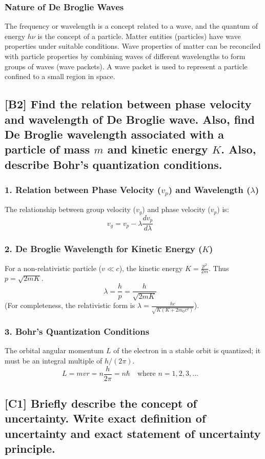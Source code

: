 \documentclass[12pt]{article}
\begin{document}
\subsubsection*{Nature of De Broglie Waves}
The frequency or wavelength is a concept related to a wave, and the quantum of energy $h\nu$ is the concept of a particle. Matter entities (particles) have wave properties under suitable conditions. Wave properties of matter can be reconciled with particle properties by combining waves of different wavelengths to form groups of waves (wave packets). A wave packet is used to represent a particle confined to a small region in space.

\subsection{[B2] Find the relation between phase velocity and wavelength of De Broglie wave. Also, find De Broglie wavelength associated with a particle of mass $m$ and kinetic energy $K$. Also, describe Bohr’s quantization conditions.}

\subsubsection*{1. Relation between Phase Velocity ($v_p$) and Wavelength ($\lambda$)}
The relationship between group velocity ($v_g$) and phase velocity ($v_p$) is:
$$
v_g = v_p - \lambda \frac{dv_p}{d\lambda} \quad \text{}
$$

\subsubsection*{2. De Broglie Wavelength for Kinetic Energy ($K$)}
For a non-relativistic particle ($v \ll c$), the kinetic energy $K = \frac{p^2}{2m}$. Thus $p = \sqrt{2mK}$.
$$
\lambda = \frac{h}{p} = \frac{h}{\sqrt{2mK}} \quad \text{}
$$
(For completeness, the relativistic form is $\lambda = \frac{hc}{\sqrt{K(K+2m_0c^2)}}$).

\subsubsection*{3. Bohr’s Quantization Conditions}
The orbital angular momentum $L$ of the electron in a stable orbit is quantized; it must be an integral multiple of $h/(2\pi)$.
$$
L = mvr = n\frac{h}{2\pi} = n\hbar \quad \text{where } n = 1, 2, 3, \ldots \quad \text{}
$$

\subsection{[C1] Briefly describe the concept of uncertainty. Write exact definition of uncertainty and exact statement of uncertainty principle.}
\end{document}
